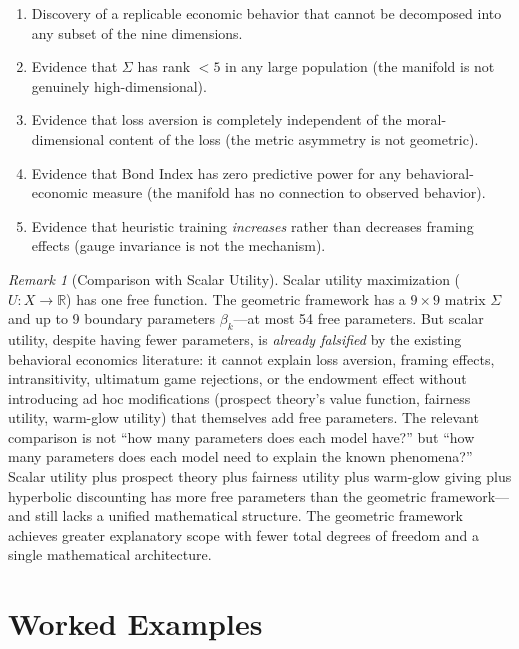 \documentclass[12pt]{article}
\theoremstyle{definition}
\theoremstyle{remark}
\newtheorem{remark}[theorem]{Remark}
\newcommand{\R}{\mathbb{R}}
\begin{document}
\begin{enumerate}
    \item Discovery of a replicable economic behavior that cannot be decomposed into any subset of the nine dimensions.
    \item Evidence that $\Sigma$ has rank $< 5$ in any large population (the manifold is not genuinely high-dimensional).
    \item Evidence that loss aversion is completely independent of the moral-dimensional content of the loss (the metric asymmetry is not geometric).
    \item Evidence that Bond Index has zero predictive power for any behavioral-economic measure (the manifold has no connection to observed behavior).
    \item Evidence that heuristic training \emph{increases} rather than decreases framing effects (gauge invariance is not the mechanism).
\end{enumerate}

\begin{remark}[Comparison with Scalar Utility]
Scalar utility maximization ($U: X \to \R$) has one free function.  The geometric framework has a $9 \times 9$ matrix $\Sigma$ and up to 9 boundary parameters $\beta_k$---at most 54 free parameters.  But scalar utility, despite having fewer parameters, is \emph{already falsified} by the existing behavioral economics literature: it cannot explain loss aversion, framing effects, intransitivity, ultimatum game rejections, or the endowment effect without introducing ad hoc modifications (prospect theory's value function, fairness utility, warm-glow utility) that themselves add free parameters.  The relevant comparison is not ``how many parameters does each model have?'' but ``how many parameters does each model need to explain the known phenomena?''  Scalar utility plus prospect theory plus fairness utility plus warm-glow giving plus hyperbolic discounting has more free parameters than the geometric framework---and still lacks a unified mathematical structure.  The geometric framework achieves greater explanatory scope with fewer total degrees of freedom and a single mathematical architecture.
\end{remark}


\section{Worked Examples}
\label{sec:examples}
\end{document}
